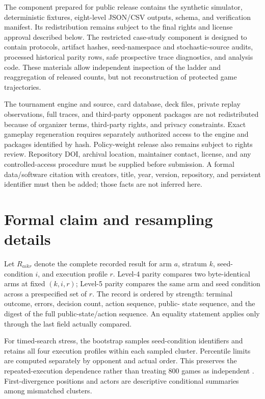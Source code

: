 \documentclass[aps,reprint,superscriptaddress,longbibliography,floatfix]{revtex4-2}
\begin{document}
The component prepared for public release contains the synthetic simulator,
deterministic fixtures, eight-level JSON/CSV outputs, schema, and verification
manifest.  Its redistribution remains subject to the final rights and license
approval described below.  The restricted case-study component is designed to
contain protocols, artifact hashes,
seed-namespace and stochastic-source audits, processed historical parity rows,
safe prospective trace diagnostics, and analysis code.  These materials allow
independent inspection of the ladder and reaggregation of released counts, but
not reconstruction of protected game trajectories.

The tournament engine and source, card database, deck files, private replay
observations, full traces, and third-party opponent packages are not
redistributed because of organizer terms, third-party rights, and privacy
constraints.  Exact gameplay regeneration requires separately authorized
access to the engine and packages identified by hash.  Policy-weight release
also remains subject to rights review.  Repository DOI, archival location,
maintainer contact, license, and any controlled-access procedure must be
supplied before submission.  A formal data/software citation with creators,
title, year, version, repository, and persistent identifier must then be added;
those facts are not inferred here.

\appendix

\section{Formal claim and resampling details}

Let $R_{aikr}$ denote the complete recorded result for arm $a$, stratum $k$,
seed-condition $i$, and execution profile $r$.  Level-4 parity compares two
byte-identical arms at fixed $(k,i,r)$; Level-5 parity compares the same arm and
seed condition across a prespecified set of $r$.  The record is ordered by
strength: terminal outcome, errors, decision count, action sequence, public-
state sequence, and the digest of the full public-state/action sequence.  An
equality statement applies only through the last field actually compared.

For timed-search stress, the bootstrap samples seed-condition identifiers and
retains all four execution profiles within each sampled cluster.  Percentile
limits are computed separately by opponent and actual order.  This preserves
the repeated-execution dependence rather than treating 800 games as independent
\cite{field2007clustered}.  First-divergence positions and actors are descriptive
conditional summaries among mismatched clusters.
\end{document}
